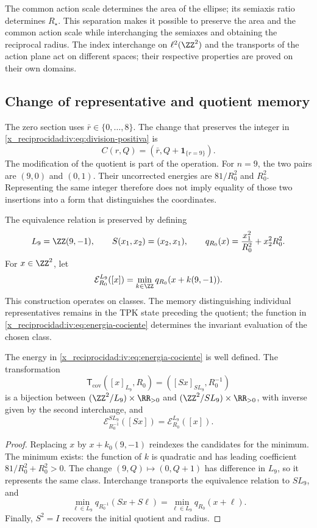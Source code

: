 The common action scale determines the area of the ellipse; its semiaxis
ratio determines \(R_\star\). This separation makes it possible to preserve
the area and the common action scale while interchanging the semiaxes and obtaining
the reciprocal radius. The index interchange on \(\ell^2(\ZZ^2)\)
and the transports of the action plane act on different spaces;
their respective properties are proved on their own domains.

\subsection{Change of representative and quotient memory}

The zero section uses \(\bar r\in\{0,\ldots,8\}\). The change
that preserves the integer in \eqref{x_reciprocidad:iv:eq:division-positiva} is
\begin{equation}
 C(r,Q)=(\bar r,Q+\mathbf1_{\{r=9\}}).
 \label{x_reciprocidad:iv:eq:cambio-seccion}
\end{equation}
The modification of the quotient is part of the operation.
For \(n=9\), the two pairs are \((9,0)\) and \((0,1)\).
Their uncorrected energies are \(81/R_0^2\) and \(R_0^2\).
Representing the same integer therefore does not imply equality of
those two insertions into a form that distinguishes the coordinates.

The equivalence relation is preserved by defining
\[
 L_9=\ZZ(9,-1),\qquad S(x_1,x_2)=(x_2,x_1),
 \qquad q_{R_0}(x)=\frac{x_1^2}{R_0^2}+x_2^2R_0^2.
\]
For \(x\in\ZZ^2\), let
\begin{equation}
 \mathcal E_{R_0}^{L_9}([x])
 =\min_{k\in\ZZ}q_{R_0}(x+k(9,-1)).
 \label{x_reciprocidad:iv:eq:energia-cociente}
\end{equation}
This construction operates on classes. The memory distinguishing
individual representatives remains in the TPK state preceding
the quotient; the function in \eqref{x_reciprocidad:iv:eq:energia-cociente}
determines the invariant evaluation of the chosen class.

\begin{theorem}
\label{x_reciprocidad:iv:thm:dualidad-cociente}
The energy in \eqref{x_reciprocidad:iv:eq:energia-cociente} is well defined.
The transformation
\[
 \mathsf T_{\mathrm{cov}}([x]_{L_9},R_0)
 =([Sx]_{SL_9},R_0^{-1})
\]
is a bijection between
\((\ZZ^2/L_9)\times\RR_{>0}\) and
\((\ZZ^2/SL_9)\times\RR_{>0}\), with inverse given by the
second interchange, and
\[
 \mathcal E_{R_0^{-1}}^{SL_9}([Sx])
 =\mathcal E_{R_0}^{L_9}([x]).
\]
\end{theorem}
\begin{proof}
Replacing \(x\) by \(x+k_0(9,-1)\) reindexes the candidates
for the minimum. The minimum exists: the function of \(k\) is quadratic and
has leading coefficient \(81/R_0^2+R_0^2>0\). The change
\((9,Q)\mapsto(0,Q+1)\) has difference in \(L_9\), so
it represents the same class. Interchange transports
the equivalence relation to \(SL_9\), and
\[
 \min_{\ell\in L_9}q_{R_0^{-1}}(Sx+S\ell)
 =\min_{\ell\in L_9}q_{R_0}(x+\ell).
\]
Finally, \(S^2=I\) recovers the initial quotient and radius.
\end{proof}

